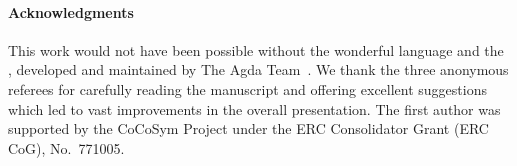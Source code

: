 \paragraph*{Acknowledgments}
This work would not have been possible without the wonderful \agda language and
the \agdastdlib, developed and maintained by The Agda Team~\cite{agdastdlib}.
We thank the three anonymous referees for carefully reading the manuscript and
offering excellent suggestions which led to vast improvements in the overall presentation.
The first author was supported by the CoCoSym Project under the ERC
Consolidator Grant (ERC CoG), No.~771005.




